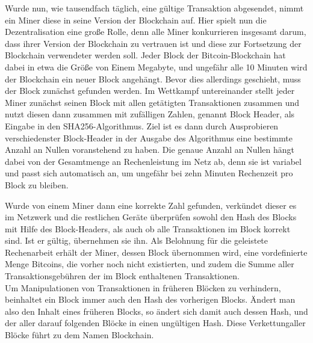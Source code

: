 \documentclass[12pt,oneside]{article}
\begin{document}
Wurde nun, wie tausendfach täglich, eine gültige Transaktion abgesendet, nimmt ein Miner diese in seine Version der Blockchain auf. Hier spielt nun die Dezentralisation eine große Rolle, denn alle Miner konkurrieren insgesamt darum, dass ihrer Version der Blockchain zu vertrauen ist und diese zur Fortsetzung der Blockchain verwendeter werden soll. Jeder Block der Bitcoin-Blockchain hat dabei in etwa die Größe von Einem Megabyte, und ungefähr alle 10 Minuten wird der Blockchain ein neuer Block angehängt. Bevor dies allerdings geschieht, muss der Block zunächst \glqq gefunden\grqq{} werden. Im Wettkampf untereinander stellt jeder Miner zunächst seinen Block mit allen getätigten Transaktionen zusammen und nutzt diesen dann zusammen mit zufälligen Zahlen, genannt Block Header, als Eingabe in den SHA256-Algorithmus. Ziel ist es dann durch Ausprobieren verschiedenster Block-Header in der Ausgabe des Algorithmus eine bestimmte Anzahl an Nullen voranstehend zu haben. Die genaue Anzahl an Nullen hängt dabei von der Gesamtmenge an Rechenleistung im Netz ab, denn sie ist variabel und passt sich automatisch an, um ungefähr bei zehn Minuten Rechenzeit pro Block zu bleiben. \cite{fraunhofer2019}

Wurde von einem Miner dann eine korrekte Zahl gefunden, verkündet dieser es im Netzwerk und die restlichen Geräte überprüfen sowohl den Hash des Blocks mit Hilfe des Block-Headers, als auch ob alle Transaktionen im Block korrekt sind. Ist er gültig, übernehmen sie ihn. Als Belohnung für die geleistete Rechenarbeit erhält der Miner, dessen Block übernommen wird, eine vordefinierte Menge Bitcoins, die vorher noch nicht existierten, und zudem die Summe aller Transaktionsgebühren der im Block enthaltenen Transaktionen. \\

Um Manipulationen von Transaktionen in früheren Blöcken zu verhindern, beinhaltet ein Block immer auch den Hash des vorherigen Blocks. Ändert man also den Inhalt eines früheren Blocks, so ändert sich damit auch dessen Hash, und der aller darauf folgenden Blöcke in einen ungültigen Hash. Diese \glqq Verkettung\grqq aller Blöcke führt zu dem Namen Blockchain. \cite{rosenberg2019}
\end{document}
